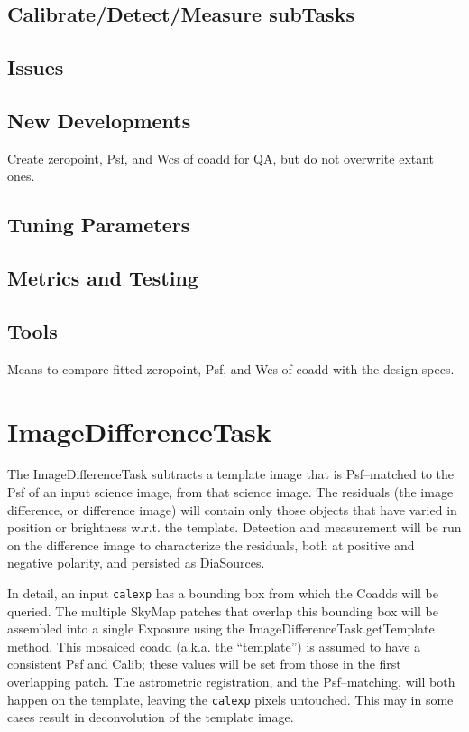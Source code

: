 \documentclass[12pt]{article}
\begin{document}
\subsection{Calibrate/Detect/Measure subTasks}

\subsection{Issues}

\subsection{New Developments}
Create zeropoint, Psf, and Wcs of coadd for QA, but do not overwrite
extant ones.

\subsection{Tuning Parameters}

\subsection{Metrics and Testing}

\subsection{Tools}
Means to compare fitted zeropoint, Psf, and Wcs of coadd with the
design specs.


\clearpage 
\section{ImageDifferenceTask \label{sec-imagedifftask}} 

The ImageDifferenceTask subtracts a template image that is
Psf--matched to the Psf of an input science image, from that science
image.  The residuals (the image difference, or difference image) will
contain only those objects that have varied in position or brightness
w.r.t. the template.  Detection and measurement will be run on the
difference image to characterize the residuals, both at positive and
negative polarity, and persisted as DiaSources.

In detail, an input {\tt calexp} has a bounding box from which the
Coadds will be queried.  The multiple SkyMap patches that overlap this
bounding box will be assembled into a single Exposure using the
ImageDifferenceTask.getTemplate method.  This mosaiced coadd
(a.k.a. the ``template'') is assumed to have a consistent Psf and
Calib; these values will be set from those in the first overlapping
patch.  The astrometric registration, and the Psf--matching, will both
happen on the template, leaving the {\tt calexp} pixels untouched.
This may in some cases result in deconvolution of the template image.
\end{document}
